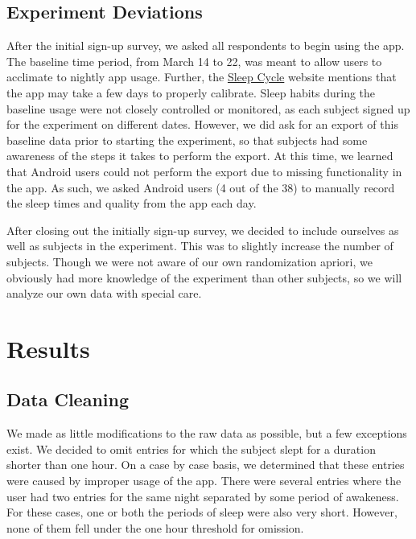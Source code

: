 \documentclass[12pt,]{article}
\begin{document}
\hypertarget{experiment-deviations}{%
\subsection{Experiment Deviations}\label{experiment-deviations}}

After the initial sign-up survey, we asked all respondents to begin
using the app. The baseline time period, from March 14 to 22, was meant
to allow users to acclimate to nightly app usage. Further, the
\href{www.sleepcycle.com}{Sleep Cycle} website mentions that the app may
take a few days to properly calibrate. Sleep habits during the baseline
usage were not closely controlled or monitored, as each subject signed
up for the experiment on different dates. However, we did ask for an
export of this baseline data prior to starting the experiment, so that
subjects had some awareness of the steps it takes to perform the export.
At this time, we learned that Android users could not perform the export
due to missing functionality in the app. As such, we asked Android users
(4 out of the 38) to manually record the sleep times and quality from
the app each day.

After closing out the initially sign-up survey, we decided to include
ourselves as well as subjects in the experiment. This was to slightly
increase the number of subjects. Though we were not aware of our own
randomization apriori, we obviously had more knowledge of the experiment
than other subjects, so we will analyze our own data with special care.

\hypertarget{results}{%
\section{Results}\label{results}}

\hypertarget{data-cleaning}{%
\subsection{Data Cleaning}\label{data-cleaning}}

We made as little modifications to the raw data as possible, but a few
exceptions exist. We decided to omit entries for which the subject slept
for a duration shorter than one hour. On a case by case basis, we
determined that these entries were caused by improper usage of the app.
There were several entries where the user had two entries for the same
night separated by some period of awakeness. For these cases, one or
both the periods of sleep were also very short. However, none of them
fell under the one hour threshold for omission.
\end{document}
